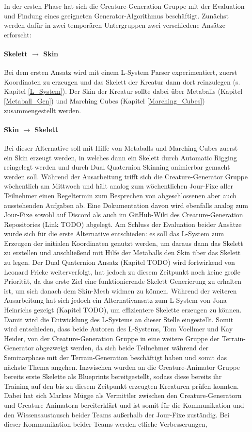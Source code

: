 In der ersten Phase hat sich die Creature-Generation Gruppe mit der Evaluation und Findung eines geeigneten Generator-Algorithmus beschäftigt. Zunächst werden dafür in zwei temporären Untergruppen zwei verschiedene Ansätze erforscht:

\paragraph{Skelett $\rightarrow$ Skin} Bei dem ersten Ansatz wird mit einem L-System Parser experimentiert, zuerst Koordinaten zu erzeugen und das Skelett der Kreatur dann dort reinzulegen (s. Kapitel \ref{L_System}). Der Skin der Kreatur sollte dabei über Metaballs (Kapitel \ref{Metaball_Gen}) und Marching Cubes (Kapitel \ref{Marching_Cubes}) zusammengestellt werden.

\paragraph{Skin $\rightarrow$ Skelett} Bei dieser Alternative soll mit Hilfe von Metaballs und Marching Cubes zuerst ein Skin erzeugt werden, in welches dann ein Skelett durch Automatic Rigging reingelegt werden und durch Dual Quaternion Skinning animierbar gemacht werden soll. Während der Ausarbeitung trifft sich die Creature-Generator Gruppe wöchentlich am Mittwoch und hält analog zum wöchentlichen Jour-Fixe aller Teilnehmer einen Regeltermin zum Besprechen von abgeschlossenen aber auch ausstehenden Aufgaben ab. Eine Dokumentation davon wird ebenfalls analog zum Jour-Fixe sowohl auf Discord als auch im GitHub-Wiki des Creature-Generation Repositories (Link TODO) abgelegt. Am Schluss der Evaluation beider Ansätze wurde sich für die erste Alternative entschieden: es soll das L-System zum Erzeugen der initialen Koordinaten genutzt werden, um daraus dann das Skelett zu erstellen und anschließend mit Hilfe der Metaballs den Skin über das Skelett zu legen. Der Dual Quaternion Ansatz (Kapitel TODO) wird fortwirkend von Leonard Fricke weiterverfolgt, hat jedoch zu diesem Zeitpunkt noch keine große Priorität, da das erste Ziel eine funktionierende Skelett Generierung zu erhalten ist, um sich danach dem Skin-Mesh widmen zu können. Während der weiteren Ausarbeitung hat sich jedoch ein Alternativansatz zum L-System von Jona Heinrichs gezeigt (Kapitel TODO), um effizientere Skelette erzeugen zu können. Damit wird die Entwicklung des L-Systems an dieser Stelle eingestellt. Somit wird entschieden, dass beide Autoren des L-Systems, Tom Voellmer und Kay Heider, von der Creature-Generation Gruppe in eine weitere Gruppe der Terrain-Generator abgezweigt werden, da sich beide Teilnehmer während der Seminarphase mit der Terrain-Generation beschäftigt haben und somit das nächste Thema angehen. Inzwischen wurden an die Creature-Animator Gruppe bereits erste Skelette als Blueprints bereitgestellt, sodass diese bereits ihr Training auf den bis zu diesem Zeitpunkt erzeugten Kreaturen prüfen konnten. Dabei hat sich Markus Mügge als Vermittler zwischen den Creature-Generatorn und Creature-Animatorn bereiterklärt und ist somit für die Kommunikation und den Wissensaustausch beider Teams außerhalb der Jour-Fixe zuständig. Bei dieser Kommunikation beider Teams werden etliche Verbesserungen, 
